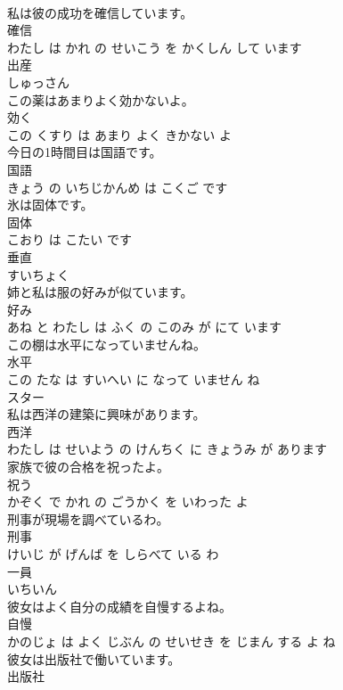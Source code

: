 \documentclass[8pt]{extreport}
\begin{document}
\begin{CJK}{UTF8}{min}
\\	私は彼の成功を確信しています。	
\\	確信 
\\	わたし は かれ の せいこう を かくしん して います			
\\	出産	
\\	しゅっさん		
\\	この薬はあまりよく効かないよ。	
\\	効く 
\\	この くすり は あまり よく きかない よ			
\\	今日の1時間目は国語です。	
\\	国語 
\\	きょう の いちじかんめ は こくご です			
\\	氷は固体です。	
\\	固体 
\\	こおり は こたい です			
\\	垂直	
\\	すいちょく		
\\	姉と私は服の好みが似ています。	
\\	好み 
\\	あね と わたし は ふく の このみ が にて います			
\\	この棚は水平になっていませんね。	
\\	水平 
\\	この たな は すいへい に なって いません ね			
\\	スター	
\\	私は西洋の建築に興味があります。	
\\	西洋 
\\	わたし は せいよう の けんちく に きょうみ が あります			
\\	家族で彼の合格を祝ったよ。	
\\	祝う 
\\	かぞく で かれ の ごうかく を いわった よ			
\\	刑事が現場を調べているわ。	
\\	刑事 
\\	けいじ が げんば を しらべて いる わ			
\\	一員	
\\	いちいん		
\\	彼女はよく自分の成績を自慢するよね。	
\\	自慢 
\\	かのじょ は よく じぶん の せいせき を じまん する よ ね			
\\	彼女は出版社で働いています。	
\\	出版社 

\end{CJK}
\end{document}
